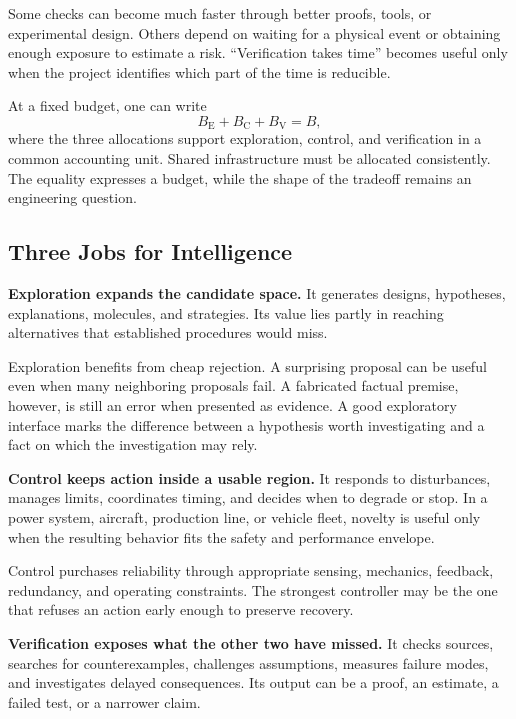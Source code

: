 \documentclass[11pt,openany]{book}
\begin{document}
Some checks can become much faster through better proofs, tools, or experimental design. Others depend on waiting for a physical event or obtaining enough exposure to estimate a risk. “Verification takes time” becomes useful only when the project identifies which part of the time is reducible.

At a fixed budget, one can write
\begin{equation}
 B_{\mathrm E}+B_{\mathrm C}+B_{\mathrm V}=B,
\end{equation}
where the three allocations support exploration, control, and verification in a common accounting unit. Shared infrastructure must be allocated consistently. The equality expresses a budget, while the shape of the tradeoff remains an engineering question.

\subsection{Three Jobs for Intelligence}

\textbf{Exploration expands the candidate space.} It generates designs, hypotheses, explanations, molecules, and strategies. Its value lies partly in reaching alternatives that established procedures would miss.

Exploration benefits from cheap rejection. A surprising proposal can be useful even when many neighboring proposals fail. A fabricated factual premise, however, is still an error when presented as evidence. A good exploratory interface marks the difference between a hypothesis worth investigating and a fact on which the investigation may rely.

\textbf{Control keeps action inside a usable region.} It responds to disturbances, manages limits, coordinates timing, and decides when to degrade or stop. In a power system, aircraft, production line, or vehicle fleet, novelty is useful only when the resulting behavior fits the safety and performance envelope.

Control purchases reliability through appropriate sensing, mechanics, feedback, redundancy, and operating constraints. The strongest controller may be the one that refuses an action early enough to preserve recovery.

\textbf{Verification exposes what the other two have missed.} It checks sources, searches for counterexamples, challenges assumptions, measures failure modes, and investigates delayed consequences. Its output can be a proof, an estimate, a failed test, or a narrower claim.
\end{document}
